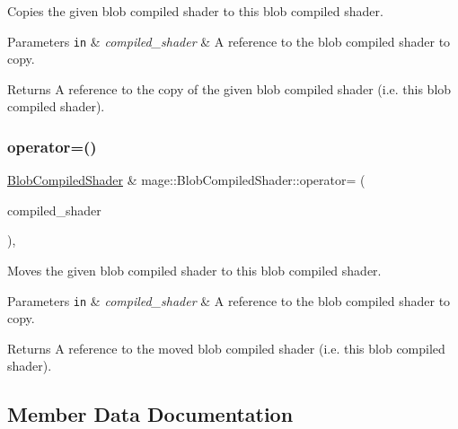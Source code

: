 Copies the given blob compiled shader to this blob compiled shader.


\begin{DoxyParams}[1]{Parameters}
\mbox{\tt in}  & {\em compiled\+\_\+shader} & A reference to the blob compiled shader to copy. \\
\hline
\end{DoxyParams}
\begin{DoxyReturn}{Returns}
A reference to the copy of the given blob compiled shader (i.\+e. this blob compiled shader). 
\end{DoxyReturn}
\hypertarget{classmage_1_1_blob_compiled_shader_ae8975eacd1f8303215cc91ab4d74faa1}{}\label{classmage_1_1_blob_compiled_shader_ae8975eacd1f8303215cc91ab4d74faa1} 
\subsubsection{\texorpdfstring{operator=()}{operator=()}\hspace{0.1cm}{\footnotesize\ttfamily [2/2]}}
{\footnotesize\ttfamily \hyperlink{classmage_1_1_blob_compiled_shader}{Blob\+Compiled\+Shader} \& mage\+::\+Blob\+Compiled\+Shader\+::operator= (\begin{DoxyParamCaption}\item[{\hyperlink{classmage_1_1_blob_compiled_shader}{Blob\+Compiled\+Shader} \&\&}]{compiled\+\_\+shader }\end{DoxyParamCaption})\hspace{0.3cm}{\ttfamily [default]}, {\ttfamily [noexcept]}}

Moves the given blob compiled shader to this blob compiled shader.


\begin{DoxyParams}[1]{Parameters}
\mbox{\tt in}  & {\em compiled\+\_\+shader} & A reference to the blob compiled shader to copy. \\
\hline
\end{DoxyParams}
\begin{DoxyReturn}{Returns}
A reference to the moved blob compiled shader (i.\+e. this blob compiled shader). 
\end{DoxyReturn}


\subsection{Member Data Documentation}
\hypertarget{classmage_1_1_blob_compiled_shader_a1a6959678592e3456ac8cb810dbdf648}{}\label{classmage_1_1_blob_compiled_shader_a1a6959678592e3456ac8cb810dbdf648} 
